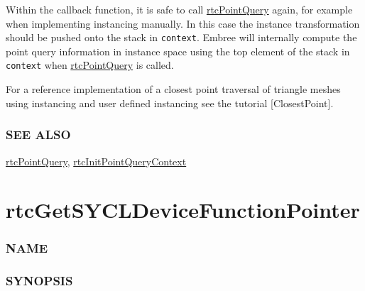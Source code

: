 Within the callback function, it is safe to call
\hyperref[rtcpointquery]{rtcPointQuery} again, for example when
implementing instancing manually. In this case the instance
transformation should be pushed onto the stack in \texttt{context}.
Embree will internally compute the point query information in instance
space using the top element of the stack in \texttt{context} when
\hyperref[rtcpointquery]{rtcPointQuery} is called.

For a reference implementation of a closest point traversal of triangle
meshes using instancing and user defined instancing see the tutorial
{[}ClosestPoint{]}.

\subsubsection{SEE ALSO}\label{see-also}

\hyperref[rtcpointquery]{rtcPointQuery},
\hyperref[rtcinitpointquerycontext]{rtcInitPointQueryContext}

\pagebreak

\section{rtcGetSYCLDeviceFunctionPointer}\label{rtcgetsycldevicefunctionpointer}

\subsubsection{NAME}\label{name}

\begin{Shaded}
\begin{Highlighting}[]
\OperatorTok{{-}}
\end{Highlighting}
\end{Shaded}

\subsubsection{SYNOPSIS}\label{synopsis}

\begin{Shaded}
\begin{Highlighting}[]

\OperatorTok{\textless{}}\OperatorTok{\textgreater{}}
 \OperatorTok{(}\OperatorTok{)}\OperatorTok{(}\OperatorTok{::}\OperatorTok{\&}\OperatorTok{);}
\end{Highlighting}
\end{Shaded}

